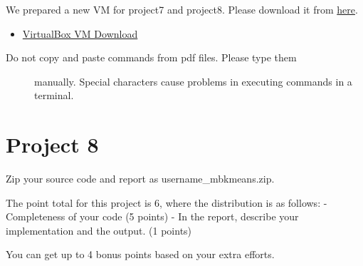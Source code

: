 We prepared a new VM for project7 and project8. Please download it from
\href{https://drive.google.com/file/d/0B2iFsq4CY1DteHhJUEk5cDNJajQ/view}{here}.

\begin{itemize}
\tightlist
\item
  \href{https://drive.google.com/file/d/0B2iFsq4CY1DteHhJUEk5cDNJajQ/view}{VirtualBox
  VM Download}
\end{itemize}



\begin{description}
\item[Do not copy and paste commands from pdf files. Please type them]
manually. Special characters cause problems in executing commands in a
terminal.
\end{description}

\chapter{Project 8}\label{project-8}

Zip your source code and report as username\_mbkmeans.zip.

The point total for this project is 6, where the distribution is as
follows: - Completeness of your code (5 points) - In the report,
describe your implementation and the output. (1 points)

You can get up to 4 bonus points based on your extra efforts.


